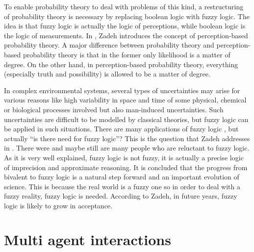 To enable probability theory to deal with problems of this kind, a restructuring of probability theory is necessary by replacing boolean logic with fuzzy logic. The idea is that fuzzy logic is actually the logic of perceptions, while boolean logic is the logic of measurements.
In \cite{Zadeh02Toward}, Zadeh introduces the concept of perception-based probability theory. A major difference between probability theory and perception-based probability theory is that in the former only likelihood is a matter of degree. On the other hand, in  perception-based probability theory, everything (especially truth and possibility) is allowed to be a matter of degree.

In complex environmental systems, several types of uncertainties may arise for various reasons like high variability in space and time of some physical, chemical or biological processes involved but also man-induced uncertainties. Such uncertainties are difficult to be modelled by classical theories, but fuzzy logic can be applied in such situations. There are many applications of fuzzy logic \cite{sarbu00fuzzyClustering, pop96aFuzzyClassification, pop96aNewFuzzy, forth00anExperiment, schroder02learningWeights, dumitrescu95degenerate, dumitrescu98degenerate}, but actually ``is there need for fuzzy logic''? This is the question that Zadeh addresses in \cite{zadeh08isThere}. There were and maybe still are many people who are reluctant to fuzzy logic. As it is very well explained, fuzzy logic is not fuzzy, it is actually a precise logic of imprecision and approximate reasoning. It is concluded that the progress from bivalent to fuzzy logic is a natural step forward and an important evolution of science. This is because the real world is a fuzzy one so in order to deal with a fuzzy reality, fuzzy logic is needed. According to Zadeh, in future years, fuzzy logic is likely to grow in acceptance.






\section{Multi agent interactions}
\label{chap:multiagentinteractions}

